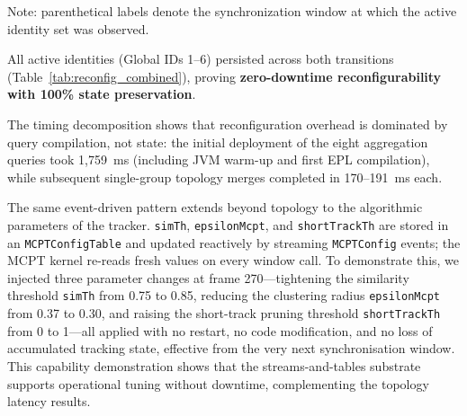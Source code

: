 \documentclass[conference]{IEEEtran}
\begin{document}
\begin{table}[t!]
\centering
\caption{Live Network Reconfiguration Timing and Global ID State Continuity}
\label{tab:reconfig_combined}
\vspace{2pt}
\parbox{\linewidth}{\raggedright\footnotesize Note: parenthetical labels denote the synchronization window at which the active identity set was observed.}
\end{table}

All active identities (Global IDs 1--6) persisted across both transitions (Table~\ref{tab:reconfig_combined}), proving \textbf{zero-downtime reconfigurability with 100\% state preservation}.

The timing decomposition shows that reconfiguration overhead is dominated by query compilation, not state: the initial deployment of the eight aggregation queries took 1{,}759~ms (including JVM warm-up and first EPL compilation), while subsequent single-group topology merges completed in 170--191~ms each.

The same event-driven pattern extends beyond topology to the algorithmic parameters of the tracker. \texttt{simTh}, \texttt{epsilonMcpt}, and \texttt{shortTrackTh} are stored in an \texttt{MCPTConfigTable} and updated reactively by streaming \texttt{MCPTConfig} events; the MCPT kernel re-reads fresh values on every window call. To demonstrate this, we injected three parameter changes at frame 270---tightening the similarity threshold \texttt{simTh} from 0.75 to 0.85, reducing the clustering radius \texttt{epsilonMcpt} from 0.37 to 0.30, and raising the short-track pruning threshold \texttt{shortTrackTh} from 0 to 1---all applied with no restart, no code modification, and no loss of accumulated tracking state, effective from the very next synchronisation window. This capability demonstration shows that the streams-and-tables substrate supports operational tuning without downtime, complementing the topology latency results.
\end{document}
